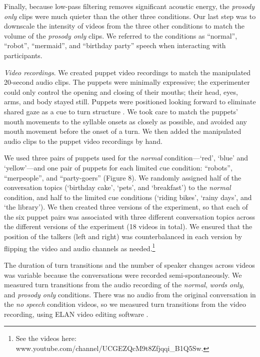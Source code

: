 \documentclass[authoryear, 12pt]{elsarticle}
\begin{document}
Finally, because low-pass filtering removes significant acoustic energy, the \textit{prosody only} clips were much quieter than the other three conditions. Our last step was to downscale the intensity of videos from the three other conditions to match the volume of the \textit{prosody only} clips. We referred to the conditions as ``normal'', ``robot'', ``mermaid'', and ``birthday party'' speech when interacting with participants.

\textit{Video recordings}. We created puppet video recordings to match the manipulated 20-second audio clips. The puppets were minimally expressive; the experimenter could only control the opening and closing of their mouths; their head, eyes, arms, and body stayed still. Puppets were positioned looking forward to eliminate shared gaze as a cue to turn structure \citep{thorgrimssonUndRev}. We took care to match the puppets' mouth movements to the syllable onsets as closely as possible, and avoided any mouth movement before the onset of a turn. We then added the manipulated audio clips to the puppet video recordings by hand.

We used three pairs of puppets used for the \textit{normal} condition---`red', `blue' and `yellow'---and one pair of puppets for each limited cue condition: ``robots'', ``merpeople'', and ``party-goers'' (Figure 8). We randomly assigned half of the conversation topics (`birthday cake', `pets', and `breakfast') to the \textit{normal} condition, and half to the limited cue conditions (`riding bikes', `rainy days', and `the library'). We then created three versions of the experiment, so that each of the six puppet pairs was associated with three different conversation topics across the different versions of the experiment (18 videos in total). We ensured that the position of the talkers (left and right) was counterbalanced in each version by flipping the video and audio channels as needed.\footnote{See the videos here: www.youtube.com/channel/UCGEZQcM9t8Zfjqqi\_B1Q5Sw.}

The duration of turn transitions and the number of speaker changes across videos was variable because the conversations were recorded semi-spontaneously. We measured turn transitions from the audio recording of the \textit{normal}, \textit{words only}, and \textit{prosody only} conditions. There was no audio from the original conversation in the \textit{no speech} condition videos, so we measured turn transitions from the video recording, using ELAN video editing software \citep{ELAN}. 
\end{document}
